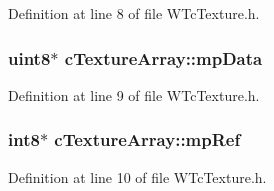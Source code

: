 Definition at line 8 of file WTcTexture.h.

\hypertarget{classc_texture_array_a736fee431cb4dd73ec293446ed912d94}{
\subsubsection[{mpData}]{\setlength{\rightskip}{0pt plus 5cm}uint8$\ast$ {\bf cTextureArray::mpData}}}
\label{classc_texture_array_a736fee431cb4dd73ec293446ed912d94}


Definition at line 9 of file WTcTexture.h.

\hypertarget{classc_texture_array_ab55426dc7159400fabe3db963e5636e0}{
\subsubsection[{mpRef}]{\setlength{\rightskip}{0pt plus 5cm}int8$\ast$ {\bf cTextureArray::mpRef}}}
\label{classc_texture_array_ab55426dc7159400fabe3db963e5636e0}


Definition at line 10 of file WTcTexture.h.

